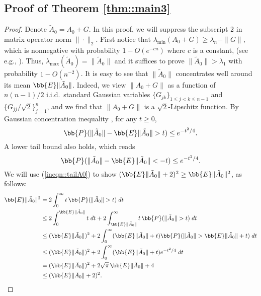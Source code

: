 \documentclass[12pt]{article}%
\theoremstyle{plain}%
\theoremstyle{remark}
\begin{document}
\subsection{Proof of Theorem \ref{thm::main3}}
\begin{proof}
Denote $\tilde{A}_0 = A_0 + G$. In this proof, we will suppress the subscript $2$ in matrix operator norm $\| \cdot \|_2$. First notice that $\lambda_{\min}(A_0 + G) \ge \lambda_n - \| G \|$, which is nonnegative with probability $1 - O(e^{-cn})$ where $c$ is a constant, (see e.g., \cite{Ver16}). Thus, $ \lambda_{\max}(\tilde{A}_0) = \| \tilde{A}_0 \|$ and it suffices to prove $\| \tilde{A}_0 \| > \lambda_1$ with probability $1 - O(n^{-2})$.  It is easy to see that $\| \tilde{A}_0 \|$ concentrates well around its mean $\bb{E} \| \tilde{A}_0 \|$. Indeed, we view $ \| A_0 + G \|$ as a function of $n(n-1)/2$ i.i.d.\ standard Gaussian variables $\{G_{jk} \}_{1 \le j < k \le n-1}$ and $\{ G_{jj}/\sqrt{2} \}_{j=1}^n$, and we find that $\| A_0 + G \|$ is a $\sqrt{2}$-Lipschitz function. By Gaussian concentration inequality \citep{BouLugMas13}, for any $t \ge 0$,
\begin{equation}\label{ineqn::tailA0}
\bb{P} ( \| \tilde{A}_0 \| - \bb{E} \| \tilde{A}_0 \| > t ) \le e^{- t^2/4}.
\end{equation}
A lower tail bound also holds, which reads
\begin{equation}\label{ineqn::tailA0-2}
\bb{P} ( \| \tilde{A}_0 \| - \bb{E} \| \tilde{A}_0 \| < - t ) \le e^{- t^2/4}.
\end{equation}
We will use (\ref{ineqn::tailA0}) to show $(\bb{E} \| \tilde{A}_0 \| + 2)^2 \ge \bb{E} \| \tilde{A}_0 \|^2$, as follows:
\begin{align*}
\bb{E} \| \tilde{A}_0 \|^2 &= 2\int_0^\infty t\, \bb{P} ( \| \tilde{A}_0 \| > t ) \; dt \\
&\le 2 \int_0 ^{\bb{E} \| \tilde{A}_0 \|}  t \;dt + 2 \int_{\bb{E} \| \tilde{A}_0 \|}^\infty t \, \bb{P} ( \| \tilde{A}_0 \| > t ) \; dt \\
&\le (\bb{E} \| \tilde{A}_0 \| )^2 + 2 \int_0^\infty (\bb{E} \| \tilde{A}_0 \|  + t) \bb{P} ( \| \tilde{A}_0 \| > \bb{E} \| \tilde{A}_0 \| + t ) \; dt \\
&\le (\bb{E} \| \tilde{A}_0 \| )^2 + 2 \int_0^\infty (\bb{E} \| \tilde{A}_0 \|  + t) e^{- t^2/4} \; dt \\
& = (\bb{E} \| \tilde{A}_0 \| )^2 + 2\sqrt{\pi}\, \bb{E} \| \tilde{A}_0 \| + 4 \\
&\le (\bb{E} \| \tilde{A}_0 \| + 2)^2.
\end{align*}

\end{proof}
\end{document}
